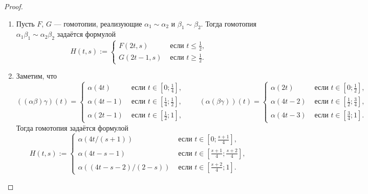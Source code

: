 \documentclass[12pt,a4paper]{article}
\begin{document}
    \begin{proof}\ 
        \begin{enumerate}
            \item Пусть $F$, $G$ --- гомотопии, реализующие $\alpha_1 \sim \alpha_2$ и $\beta_1 \sim \beta_2$. Тогда гомотопия $\alpha_1 \beta_1 \sim \alpha_2 \beta_2$ задаётся формулой
                \[
                    H(t, s) :=
                    \begin{cases}
                        F(2t, s)& \text{ если } t \leqslant \frac{1}{2},\\
                        G(2t-1, s)& \text{ если } t \geqslant \frac{1}{2}.
                    \end{cases}
                \]
            \item Заметим, что
                \[
                    ((\alpha\beta)\gamma)(t) =
                    \begin{cases}
                        \alpha(4t)& \text{ если } t \in \left[0; \frac{1}{4}\right],\\
                        \alpha(4t-1)& \text{ если } t \in \left[\frac{1}{4}; \frac{1}{2}\right],\\
                        \alpha(2t-1)& \text{ если } t \in \left[\frac{1}{2}; 1\right],
                    \end{cases}
                    \qquad
                    (\alpha(\beta\gamma))(t) =
                    \begin{cases}
                        \alpha(2t)& \text{ если } t \in \left[0; \frac{1}{2}\right],\\
                        \alpha(4t-2)& \text{ если } t \in \left[\frac{1}{2}; \frac{3}{4}\right],\\
                        \alpha(4t-3)& \text{ если } t \in \left[\frac{3}{4}; 1\right].
                    \end{cases}
                \]
                Тогда гомотопия задаётся формулой
                \[
                    H(t, s) :=
                    \begin{cases}
                        \alpha(4t/(s+1))& \text{ если } t \in \left[0; \frac{s+1}{4}\right],\\
                        \alpha(4t-s-1)& \text{ если } t \in \left[\frac{s+1}{4}; \frac{s+2}{4}\right],\\
                        \alpha((4t-s-2)/(2-s))& \text{ если } t \in \left[\frac{s+2}{4}; 1\right].
                    \end{cases}
\]
\end{enumerate}
\end{proof}
\end{document}
